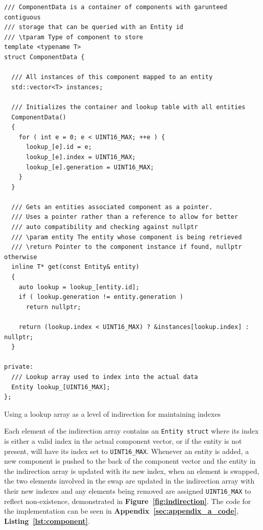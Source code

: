\documentclass[10pt]{scrartcl}
\begin{document}
		\begin{listing}[H]
	\begin{verbatim}
/// ComponentData is a container of components with garunteed contiguous
/// storage that can be queried with an Entity id
/// \tparam Type of component to store
template <typename T>
struct ComponentData {

  /// All instances of this component mapped to an entity
  std::vector<T> instances;

  /// Initializes the container and lookup table with all entities
  ComponentData()
  {
    for ( int e = 0; e < UINT16_MAX; ++e ) {
      lookup_[e].id = e;
      lookup_[e].index = UINT16_MAX;
      lookup_[e].generation = UINT16_MAX;
    }
  }

  /// Gets an entities associated component as a pointer.
  /// Uses a pointer rather than a reference to allow for better
  /// auto compatibility and checking against nullptr
  /// \param entity The entity whose component is being retrieved
  /// \return Pointer to the component instance if found, nullptr otherwise
  inline T* get(const Entity& entity)
  {
    auto lookup = lookup_[entity.id];
    if ( lookup.generation != entity.generation )
      return nullptr;

    return (lookup.index < UINT16_MAX) ? &instances[lookup.index] : nullptr;
  }

private:
  /// Lookup array used to index into the actual data
  Entity lookup_[UINT16_MAX];
};
	\end{verbatim}
	\caption{Using a lookup array as a level of indirection for maintaining indexes}
	\label{lst:lookup}
	\end{listing}	

	Each element of the indirection array contains an \texttt{Entity struct} where its index is either a valid index in the actual component vector, or if the entity is not present, will have its index set to \texttt{UINT16_MAX}. Whenever an entity is added, a new component is pushed to the back of the component vector and the entity in the indirection array is updated with its new index, when an element is swapped, the two elements involved in the swap are updated in the indirection array with their new indexes and any elements being removed are assigned \texttt{UINT16_MAX} to reflect non-existence, demonstrated in \textbf{Figure~\ref{fig:indirection}}. The code for the implementation can be seen in \textbf{Appendix~\ref{sec:appendix_a_code}}, \textbf{Listing~\ref{lst:component}}.
\end{document}
